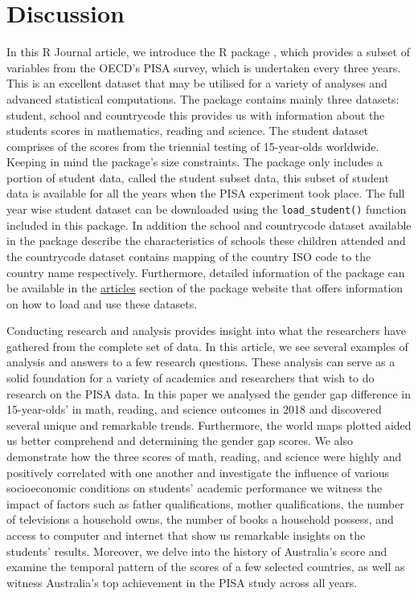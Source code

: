 \hypertarget{discussion}{%
\section{Discussion}\label{discussion}}

In this R Journal article, we introduce the R package , which provides a subset of variables from the OECD's PISA survey, which is undertaken every three years. This is an excellent dataset that may be utilised for a variety of analyses and advanced statistical computations. The package contains mainly three datasets: student, school and countrycode this provides us with information about the students scores in mathematics, reading and science. The student dataset comprises of the scores from the triennial testing of 15-year-olds worldwide. Keeping in mind the package's size constraints. The package only includes a portion of student data, called the student subset data, this subset of student data is available for all the years when the PISA experiment took place. The full year wise student dataset can be downloaded using the \texttt{load\_student()} function included in this package. In addition the school and countrycode dataset available in the package describe the characteristics of schools these children attended and the countrycode dataset contains mapping of the country ISO code to the country name respectively. Furthermore, detailed information of the  package can be available in the \href{https://kevinwang09.github.io/learningtower/articles/learningtower_school.html}{articles} section of the package website that offers information on how to load and use these datasets.

Conducting research and analysis provides insight into what the researchers have gathered from the complete set of data. In this article, we see several examples of analysis and answers to a few research questions. These analysis can serve as a solid foundation for a variety of academics and researchers that wish to do research on the PISA data. In this paper we analysed the gender gap difference in 15-year-olds' in math, reading, and science outcomes in 2018 and discovered several unique and remarkable trends. Furthermore, the world maps plotted aided us better comprehend and determining the gender gap scores. We also demonstrate how the three scores of math, reading, and science were highly and positively correlated with one another and investigate the influence of various socioeconomic conditions on students' academic performance we witness the impact of factors such as father qualifications, mother qualifications, the number of televisions a household owns, the number of books a household possess, and access to computer and internet that show us remarkable insights on the students' results. Moreover, we delve into the history of Australia's score and examine the temporal pattern of the scores of a few selected countries, as well as witness Australia's top achievement in the PISA study across all years.

